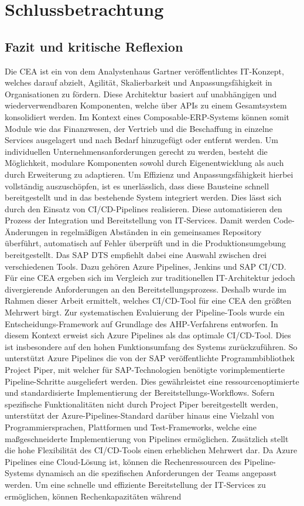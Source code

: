 \section{Schlussbetrachtung}

\subsection{Fazit und kritische Reflexion}
Die CEA ist ein von dem Analystenhaus Gartner veröffentlichtes IT-Konzept, welches darauf abzielt, Agilität, Skalierbarkeit und Anpassungsfähigkeit in Organisationen zu fördern. Diese Architektur basiert auf unabhängigen und wiederverwendbaren Komponenten, welche über APIs zu einem Gesamtsystem konsolidiert werden. Im Kontext eines Composable-ERP-Systems können somit Module wie das Finanzwesen, der Vertrieb und die Beschaffung in einzelne Services ausgelagert und nach Bedarf hinzugefügt oder entfernt werden. Um individuellen Unternehmensanforderungen gerecht zu werden, besteht die Möglichkeit, modulare Komponenten sowohl durch Eigenentwicklung als auch durch Erweiterung zu adaptieren. Um Effizienz und Anpassungsfähigkeit hierbei vollständig auszuschöpfen, ist es unerlässlich, dass diese Bausteine schnell bereitgestellt und in das bestehende System integriert werden. Dies lässt sich durch den Einsatz von CI/CD-Pipelines realisieren. Diese automatisieren den Prozess der Integration und Bereitstellung von IT-Services. Damit werden Code-Änderungen in regelmäßigen Abständen in ein gemeinsames Repository überführt, automatisch auf Fehler überprüft und in die Produktionsumgebung bereitgestellt. Das SAP DTS empfiehlt dabei eine Auswahl zwischen drei verschiedenen Tools. Dazu gehören Azure Pipelines, Jenkins und SAP CI/CD.\\ Für eine CEA ergeben sich im Vergleich zur traditionellen IT-Architektur jedoch divergierende Anforderungen an den Bereitstellungsprozess. Deshalb wurde im Rahmen dieser Arbeit ermittelt, welches CI/CD-Tool für eine CEA den größten Mehrwert birgt. Zur systematischen Evaluierung der Pipeline-Tools wurde ein Entschei\-dungs-Framework auf Grundlage des AHP-Verfahrens entworfen. In diesem Kontext erweist sich Azure Pipelines als das optimale CI/CD-Tool. Dies ist insbesondere auf den hohen Funktionsumfang des Systems zurückzuführen. So unterstützt Azure Pipelines die von der SAP veröffentlichte Programmbibliothek Project Piper, mit welcher für SAP-Technologien benötigte vorimplementierte Pipeline-Schritte ausgeliefert werden. Dies gewährleistet eine ressourcenoptimierte und standardisierte Implementierung der Bereitstellungs-Workflows. Sofern spezifische Funktionalitäten nicht durch Project Piper bereitgestellt werden, unterstützt der Azure-Pipelines-Standard darüber hinaus eine Vielzahl von Programmiersprachen, Plattformen und Test-Frameworks, welche eine maßgeschneiderte Implementierung von Pipelines ermöglichen. Zusätzlich stellt die hohe Flexibilität des CI/CD-Tools einen erheblichen Mehrwert dar. Da Azure Pipelines eine Cloud-Lösung ist, können die Rechenressourcen des Pipeline-Systems dynamisch an die spezifischen Anforderungen der Teams angepasst werden. Um eine schnelle und effiziente Bereitstellung der IT-Services zu ermöglichen, können Rechenkapazitäten während 